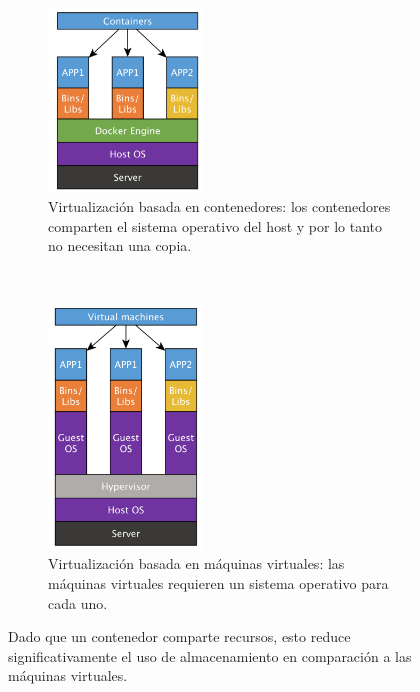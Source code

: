 \begin{figure}[t]
    \centering
    \begin{subfigure}[b]{0.48\textwidth}
         \centering
    	\includegraphics[width=0.45\textwidth]{Figures/containers.png}
    	\caption[Virtualización basada en contenedores]{Virtualización basada en contenedores: los contenedores comparten el sistema operativo del host y por lo tanto no necesitan una copia.}
    	\label{fig:contenedor-arch}
     \end{subfigure}
    ~ 
    \begin{subfigure}[b]{0.48\textwidth}
         \centering
    	\includegraphics[width=0.45\textwidth]{Figures/virtual.png}
    	\caption[Virtualización basada en máquinas virtuales]{Virtualización basada en máquinas virtuales: las máquinas virtuales requieren un sistema operativo para cada uno.}
    	\label{fig:vm-arch}
     \end{subfigure}
        \caption[Comparación entre virtualizacion basada de contenedores y máquinas virtuales]{Dado que un contenedor comparte recursos, esto reduce significativamente el uso de almacenamiento en comparación a las máquinas virtuales.}
        \label{fig:virtualization}
\end{figure}

